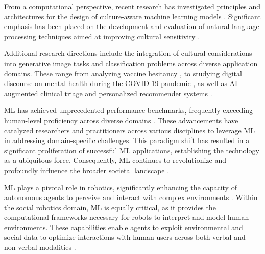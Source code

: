 From a computational perspective, recent research has investigated principles and architectures for the design of culture-aware machine learning models \citep{miehle2021multimodal, khan2021one, dmytryk2022mining, karpouzis2024plato}. Significant emphasis has been placed on the development and evaluation of natural language processing techniques aimed at improving cultural sensitivity \citep{blanchard2024cultural, bhatia2023gd, almaliki2016persuasive, dlHumorRecognition, albuquerque2024hype, Wu2012TheAO, cirucci2024culturally, kuo2024identification, dwivedi2024navigating}.

Additional research directions include the integration of cultural considerations into generative image tasks \citep{Quan2018, Zhou2022445, yun2024cic, mohamed2022artelingo} and classification problems across diverse application domains. These range from analyzing vaccine hesitancy \citep{alharbi2023cultural, alharbi2024deep}, to studying digital discourse on mental health during the COVID-19 pandemic \citep{castilla2022applying}, as well as AI-augmented clinical triage \citep{jordan2023impact} and personalized recommender systems \citep{yohe2023towards}.



ML has achieved unprecedented performance benchmarks, frequently exceeding human-level proficiency across diverse domains \citep{openai2023gpt4, alphago, minerva, human_performance}. 
These advancements have catalyzed researchers and practitioners across various disciplines to leverage ML in addressing domain-specific challenges. 
This paradigm shift has resulted in a significant proliferation of successful ML applications, establishing the technology as a ubiquitous force. 
Consequently, ML continues to revolutionize and profoundly influence the broader societal landscape \citep{MLForSociety, MLTrends}.

ML plays a pivotal role in robotics, significantly enhancing the capacity of autonomous agents to perceive and interact with complex environments \citep{DLRobotics, RLRobotics, MPRobotics, xu2020learning, bredeche2006perceptual, nguyen2020deep, zhou2022computer, arzani2020switching, hong2020multimodal, gao2021hybrid, yu2021deep}. 
Within the social robotics domain, ML is equally critical, as it provides the computational frameworks necessary for robots to interpret and model human environments. 
These capabilities enable agents to exploit environmental and social data to optimize interactions with human users across both verbal and non-verbal modalities \citep{SocialRobotics, zheng2013designing, jacob2015optimal, saunderson2020investigating, ogenyi2019physical, rakovic2022gaze, alsamhi2022autonomous}.

